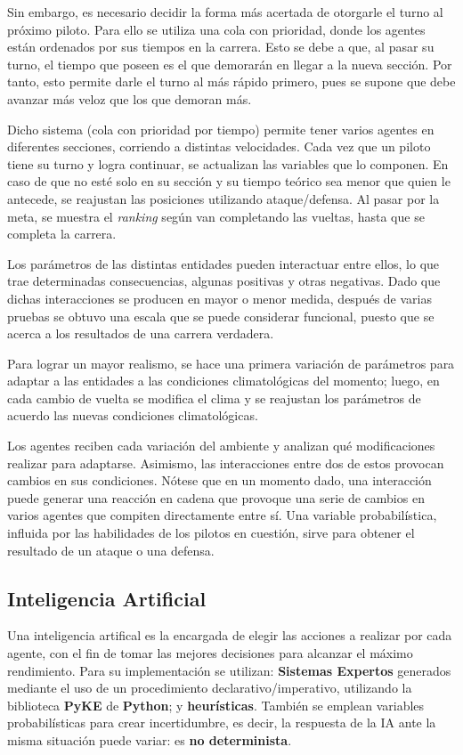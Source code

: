 \documentclass[12pt, letterpaper,spanish]{article}
\theoremstyle{definition}
\theoremstyle{remark}
\begin{document}
		Sin embargo, es necesario decidir la forma más acertada de otorgarle el turno al próximo piloto. Para ello se utiliza una cola con prioridad, donde los agentes están ordenados por sus tiempos en la carrera. Esto se debe a que, al pasar su turno, el tiempo que poseen es el que demorarán en llegar a la nueva sección. Por tanto, esto permite darle el turno al más rápido primero, pues se supone que debe avanzar más veloz que los que demoran más.

		Dicho sistema (cola con prioridad por tiempo) permite tener varios agentes en diferentes secciones, corriendo a distintas velocidades. Cada vez que un piloto tiene su turno y logra continuar, se actualizan las variables que lo componen. En caso de que no esté solo en su sección y su tiempo teórico sea menor que quien le antecede, se reajustan las posiciones utilizando ataque/defensa. Al pasar por la meta, se muestra el \emph{ranking} según van completando las vueltas, hasta que se completa la carrera.

		Los parámetros de las distintas entidades pueden interactuar entre ellos, lo que trae determinadas consecuencias, algunas positivas y otras negativas. Dado que dichas interacciones se producen en mayor o menor medida, después de varias pruebas se obtuvo una escala que se puede considerar funcional, puesto que se acerca a los resultados de una carrera verdadera. 

		Para lograr un mayor realismo, se hace una primera variación de parámetros para adaptar a las entidades a las condiciones climatológicas del momento; luego, en cada cambio de vuelta se modifica el clima y se reajustan los parámetros de acuerdo las nuevas condiciones climatológicas.

		Los agentes reciben cada variación del ambiente y analizan qué modificaciones realizar para adaptarse. Asimismo, las interacciones entre dos de estos provocan cambios en sus condiciones. Nótese que en un momento dado, una interacción puede generar una reacción en cadena que provoque una serie de cambios en varios agentes que compiten directamente entre sí. Una variable probabilística, influida por las habilidades de los pilotos en cuestión, sirve para obtener el resultado de un ataque o una defensa.


	\newpage

	\subsection{Inteligencia Artificial  {\footnotesize \cite{conferenciasIA}\cite{russell}}}
	Una inteligencia artifical es la encargada de elegir las acciones a realizar por cada agente, con el fin de tomar las mejores decisiones para alcanzar el máximo rendimiento. Para su implementación se utilizan: \textbf{Sistemas Expertos} generados mediante el uso de un procedimiento declarativo/imperativo, utilizando la biblioteca \textbf{PyKE}{\footnotesize \cite{pyke}} de \textbf{Python}; y \textbf{heurísticas}. También se emplean variables probabilísticas para crear incertidumbre, es decir, la respuesta de la IA ante la misma situación puede variar: es \textbf{no determinista}.
	
\end{document}
